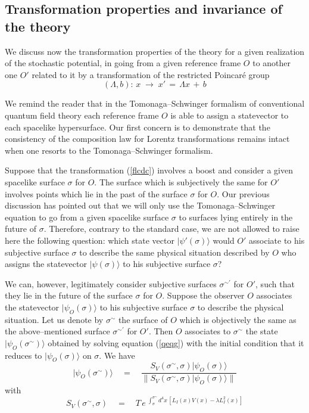 \documentclass[10pt,a4paper]{article}
\begin{document}
\subsection{Transformation properties and invariance of the theory}
\label{sec94}

We discuss now the transformation properties of the theory for a
given realization of the stochastic potential, in going from a
given reference frame $O$ to another one $O'$ related to it by a
transformation of the restricted Poincar\'e group
\begin{equation} \label{flcdc}
(\Lambda,b):\, x\; \rightarrow \; x'\, = \, \Lambda x\, + \, b
\end{equation}

We remind the reader that in the Tomonaga--Schwinger formalism of
conventional quantum field theory each reference frame $O$ is able
to assign a statevector to each spacelike hypersurface. Our first
concern is to demonstrate that the consistency of the composition
law for Lorentz transformations remains intact when one resorts to
the Tomonaga--Schwinger formalism.

Suppose that the transformation (\ref{flcdc}) involves a boost and
consider a given spacelike surface $\sigma$ for $O$. The surface
which is subjectively the same for $O'$ involves points which lie
in the past of the surface $\sigma$ for $O$. Our previous
discussion has pointed out that we will only use the
Tomonaga--Schwinger equation to go from a given spacelike surface
$\sigma$ to surfaces lying entirely in the future of $\sigma$.
Therefore, contrary to the standard case, we are not allowed to
raise here the following question: which state vector
$|\psi'(\sigma)\rangle$ would $O'$ associate to his subjective
surface $\sigma$ to describe the same physical situation described
by $O$ who assigns the statevector $|\psi(\sigma)\rangle$ to his
subjective surface $\sigma$?

We can, however, legitimately consider subjective surfaces
$\sigma{}^{\sim\prime}$ for $O'$, such that they lie in the future
of the surface $\sigma$ for $O$. Suppose the observer $O$
associates the statevector $|\psi_{O}(\sigma)\rangle$ to his
subjective surface $\sigma$ to describe the physical situation.
Let us denote by $\sigma{}^{\sim}$ the surface of $O$ which is
objectively the same as the above--mentioned surface
$\sigma{}^{\sim\prime}$ for $O'$. Then $O$ associates to
$\sigma{}^{\sim}$ the state $|\psi_{O}(\sigma{}^{\sim})\rangle$
obtained by solving equation (\ref{qeqg}) with the initial
condition that it reduces to $|\psi_{O}(\sigma)\rangle$ on
$\sigma$. We have
\begin{equation}
|\psi_{O}(\sigma{}^{\sim})\rangle \quad = \quad \frac{S_{V}
(\sigma{}^{\sim}, \sigma) |\psi_{O}(\sigma)\rangle}{ \|
S_{V}(\sigma{}^{\sim}, \sigma) |\psi_{O}(\sigma)\rangle\|}
\end{equation}
with
\begin{equation} \label{fqfl}
S_{V}(\sigma{}^{\sim}, \sigma) \quad = \quad T\, e^{\displaystyle
\; \int_{\sigma}^{\sigma{}^{\sim}} d^{4}x\, [L_{I}(x) V(x) -
\lambda L_{I}^{2}(x)]}
\end{equation}
\end{document}

